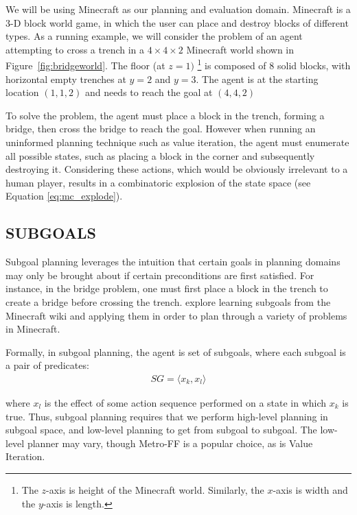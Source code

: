 \documentclass[]{article}
\begin{document}
We will be using Minecraft as our planning and evaluation domain. Minecraft
is a 3-D block world game, in which the user can place and destroy blocks of
different types. As a running example, we will consider the problem of an agent
attempting to cross a trench in a $4 \times 4 \times 2$ Minecraft world shown
in Figure~\ref{fig:bridgeworld}. The floor (at $z = 1)$ \footnote{The $z$-axis
is height of the Minecraft world. Similarly, the $x$-axis is width and the
$y$-axis is length.} is composed of 8 solid blocks, with horizontal empty
trenches at $y = 2$ and $y = 3$. The agent is  at the starting location
$(1, 1, 2)$ and needs to reach the goal at $(4,4,2)$

To solve the problem, the agent must
place a block in the trench, forming a bridge, then cross the bridge
to reach the goal.  However when running an uninformed planning
technique such as value iteration, the agent must enumerate all
possible states, such as placing a block in the corner and
subsequently destroying it.  Considering these actions, which would be
obviously irrelevant to a human player, results in a combinatoric
explosion of the state space (see Equation \ref{eq:mc_explode}).

\subsection{SUBGOALS}

Subgoal planning leverages the intuition that certain goals in
planning domains may only be brought about if certain preconditions
are first satisfied. For instance, in the bridge problem, one must
first place a block in the trench to create a bridge before crossing
the trench.  \citet{branavan12a} explore learning subgoals from the
Minecraft wiki and applying them in order to plan through a variety of
problems in Minecraft.  

Formally, in subgoal planning, the agent is set of subgoals, where each subgoal is a pair of predicates:
\begin{align}
SG = \langle x_k, x_l \rangle
\end{align}

where $x_l$ is the effect of some action sequence performed on 
a state in which $x_k$ is true. Thus, subgoal planning requires 
that we perform high-level planning in subgoal space, and low-level 
planning to get from subgoal to subgoal. The low-level planner may vary, though
Metro-FF is a popular choice, as is Value Iteration.
\end{document}
